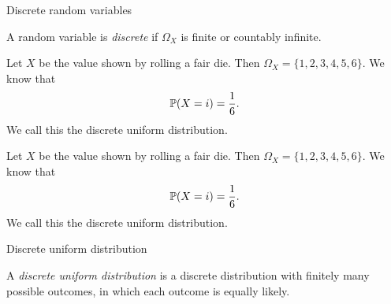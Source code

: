 %
\begin{note}
  \begin{field}
    Discrete random variables
  \end{field}
  \begin{field}
    \begin{defi}
      A random variable is \emph{discrete} if $\Omega_X$ is finite or countably infinite.
    \end{defi}
  \end{field}
  \xplain{}%
\end{note}

\begin{note}
  \begin{field}
    \begin{eg}
      Let $X$ be the value shown by rolling a fair die. Then $\Omega_X = \{1, 2, 3, 4, 5, 6\}$. We know that
      \[
        \P(X = i) = \frac{1}{6}.
      \]
      We call this the discrete uniform distribution.
    \end{eg}
  \end{field}
  \begin{field}
    \begin{eg}
      Let $X$ be the value shown by rolling a fair die. Then $\Omega_X = \{1, 2, 3, 4, 5, 6\}$. We know that
      \[
        \P(X = i) = \frac{1}{6}.
      \]
      We call this the discrete uniform distribution.
    \end{eg}
  \end{field}
  \xplain{}%
\end{note}

%
\begin{note}
  \begin{field}
    Discrete uniform distribution
  \end{field}
  \begin{field}
    \begin{defi}
      A \emph{discrete uniform distribution} is a discrete distribution with finitely many possible outcomes, in which each outcome is equally likely.
    \end{defi}
  \end{field}
  \xplain{}%
\end{note}

